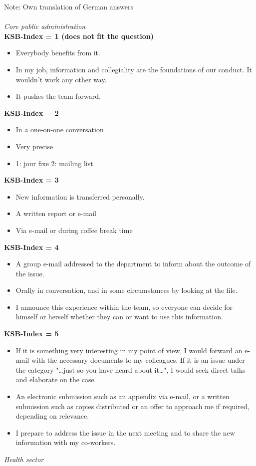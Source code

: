 \documentclass[twocolumn, issue, empirical, authordate]{jote-new-article}
\begin{document}
Note: Own translation of German answers
\\ \\
\noindent\emph{Core public administration} 
\\

\textbf{KSB-Index = 1 (does not fit the question)}
\\
\begin{itemize} \item Everybody benefits from it.
\item In my job, information and collegiality are the foundations of our conduct. It wouldn't work any other way.
\item It pushes the team forward.
\end{itemize} 


\textbf{KSB-Index = 2}

\begin{itemize} \item In a one-on-one conversation \item Very precise \item 1: jour fixe 2: mailing list \end{itemize} 


\textbf{KSB-Index = 3}

\begin{itemize} \item New information is transferred personally.
\item A written report or e-mail \item Via e-mail or during coffee break time \end{itemize} 


\textbf{KSB-Index = 4}

\begin{itemize} \item A group e-mail addressed to the department to inform about the outcome of the issue.
\item Orally in conversation, and in some circumstances by looking at the file.
\item I announce this experience within the team, so everyone can decide for himself or herself whether they can or want to use this information.
\end{itemize} 


\textbf{KSB-Index = 5}

\begin{itemize} \item If it is something very interesting in my point of view, I would forward an e-mail with the necessary documents to my colleagues. If it is an issue under the category "\ldots just so you have heard about it\ldots", I would seek direct talks and elaborate on the case.
\item An electronic submission such as an appendix via e-mail, or a written submission such as copies distributed or an offer to approach me if required, depending on relevance.
\item I prepare to address the issue in the next meeting and to share the new information with my co-workers.
\end{itemize} 
\newpage
\noindent\emph{Health sector} 
\\
\end{document}
